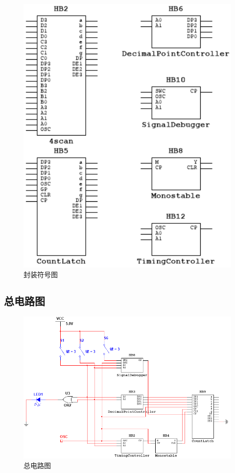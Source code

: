 \documentclass[12pt]{article}
\begin{document}
\begin{figure}[H]
    \centering
    \includegraphics[width=1\textwidth]{./fig/symbol.png}
    \caption{封装符号图}
    \label{fig:symbol}
\end{figure}

\subsection*{总电路图}

\begin{figure}[H]
    \centering
    \includegraphics[width=1\textwidth]{./fig/total.png}
    \caption{总电路图}
    \label{fig:total}
\end{figure}
\end{document}
